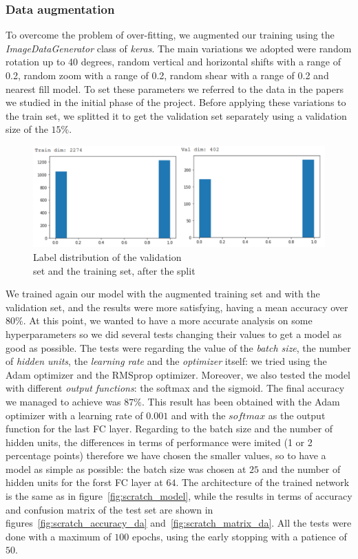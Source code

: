 \documentclass[11pt,a4paper,oneside]{article}
\begin{document}
\subsubsection{Data augmentation}
To overcome the problem of over-fitting, we augmented our training using the \textit{ImageDataGenerator} class of \textit{keras}. The main variations we adopted were random rotation up to 40 degrees, random vertical and horizontal shifts with a range of 0.2, random zoom with a range of 0.2, random shear with a range of 0.2 and nearest fill model. To set these parameters we referred to the data in the papers we studied in the initial phase of the project. Before applying these variations to the train set, we splitted it to get the validation set separately using a validation size of the $15\%$.

\begin{figure}[h]
\centering
\includegraphics[width=.7\textwidth]{images/val_label_distribution}
\caption{Label distribution of the validation \\set and the training set, after the split}
\label{fig:val_label}
\end{figure}

We trained again our model with the augmented training set and with the validation set, and the results were more satisfying, having a mean accuracy over $80\%$. At this point, we wanted to have a more accurate analysis on some hyperparameters so we did several tests changing their values to get a model as good as possible. 
The tests were regarding the value of the \textit{batch size}, the number of \textit{hidden units}, the \textit{learning rate} and the \textit{optimizer} itself: we tried using the Adam optimizer and the RMSprop optimizer. Moreover, we also tested the model with different \textit{output functions}: the softmax and the sigmoid. 
The final accuracy we managed to achieve was $87\%$. This result has been obtained with the Adam optimizer with a learning rate of $0.001$ and with the $softmax$ as the output function for the last FC layer. Regarding to the batch size and the number of hidden units, the differences in terms of performance were imited (1 or 2 percentage points) therefore we have chosen the smaller values, so to have a model as simple as possible: the batch size was chosen at $25$ and the number of hidden units for the forst FC layer at $64$. The architecture of the trained network is the same as in figure~\ref{fig:scratch_model}, while the results in terms of accuracy and confusion matrix of the test set are shown in figures~\ref{fig:scratch_accuracy_da} and~\ref{fig:scratch_matrix_da}.
All the tests were done with a maximum of $100$ epochs, using the early stopping with a patience of $50$.
\end{document}
